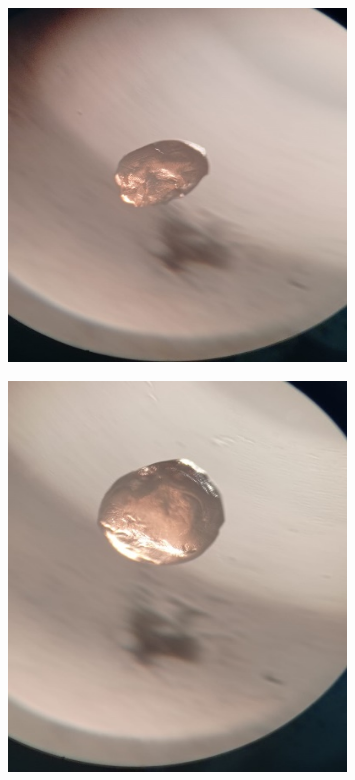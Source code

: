 \begin{figure}[H]
	\centering
	\includegraphics[width=0.8\textwidth]{media/pish/image39}
	\caption*{}
\end{figure}


\begin{figure}[H]
	\centering
	\includegraphics[width=0.8\textwidth]{media/pish/image40}
	\caption*{}
\end{figure}


